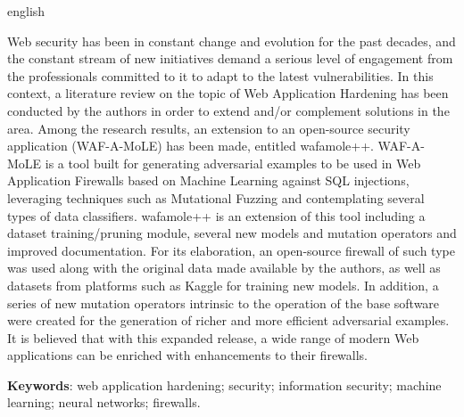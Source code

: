 \begin{resumo}[Abstract]
\begin{otherlanguage*}{english}
\begin{SingleSpace}
Web security has been in constant change and evolution for the past decades, and the constant stream of new initiatives demand a serious level of engagement from the professionals committed to it to adapt to the latest vulnerabilities. In this context, a literature review on the topic of Web Application Hardening has been conducted by the authors in order to extend and/or complement solutions in the area. Among the research results, an extension to an open-source security application (WAF-A-MoLE) has been made, entitled wafamole++. WAF-A-MoLE is a tool built for generating adversarial examples to be used in Web Application Firewalls based on Machine Learning against SQL injections, leveraging techniques such as Mutational Fuzzing and contemplating several types of data classifiers. wafamole++ is an extension of this tool including a dataset training/pruning module, several new models and mutation operators and improved documentation. For its elaboration, an open-source firewall of such type was used along with the original data made available by the authors, as well as datasets from platforms such as Kaggle for training new models. In addition, a series of new mutation operators intrinsic to the operation of the base software were created for the generation of richer and more efficient adversarial examples. It is believed that with this expanded release, a wide range of modern Web applications can be enriched with enhancements to their firewalls.
\end{SingleSpace}


\vspace{\onelineskip}
   \textbf{Keywords}: web application hardening; security; information security; machine learning; neural networks; firewalls.
   
 \end{otherlanguage*}
\end{resumo}




  
